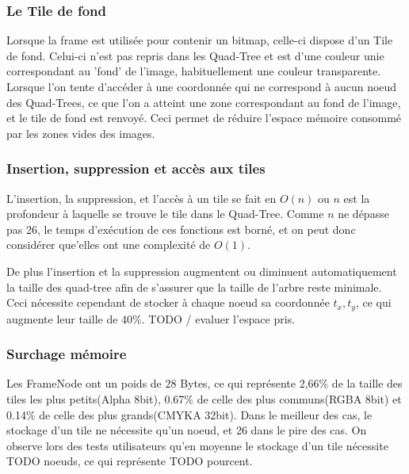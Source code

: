 			\subsubsection{Le Tile de fond}
				Lorsque la frame est utilisée pour contenir un bitmap, celle-ci dispose d'un Tile de fond. Celui-ci n'est pas repris
				dans les Quad-Tree et est d'une couleur unie correspondant au 'fond' de l'image, habituellement une couleur transparente.
				Lorsque l'on tente d'accéder à une coordonnée qui ne correspond à aucun noeud des Quad-Trees, ce que l'on a atteint une zone
				correspondant au fond de l'image, et le tile de fond est renvoyé. Ceci permet de réduire l'espace mémoire consommé par les zones 
				vides des images.

			\subsubsection{Insertion, suppression et accès aux tiles}
				L'insertion, la suppression, et l'accès à un tile se fait en $O(n)$ ou $n$ est la profondeur à laquelle se trouve le tile dans 
				le Quad-Tree. Comme $n$ ne dépasse pas 26, le temps d'exécution de ces fonctions est borné, et on peut donc considérer que'elles
				ont une complexité de $O(1)$. 
				
				De plus l'insertion et la suppression augmentent ou diminuent automatiquement la taille des 
				quad-tree afin de s'assurer que la taille de l'arbre reste minimale. Ceci nécessite cependant de stocker à chaque noeud 
				sa coordonnée $t_x,t_y$, ce qui augmente leur taille de 40\%. TODO / evaluer l'espace pris.

			\subsubsection{Surchage mémoire}
				Les FrameNode ont un poids de $28$ Bytes, ce qui représente 2,66\% de la taille des tiles les plus petits(Alpha 8bit), 0.67\% de celle des plus
				communs(RGBA 8bit)  et 0.14\% de celle des plus grands(CMYKA 32bit). Dans le meilleur des cas, le stockage d'un tile ne 
				nécessite qu'un noeud, et 26 dans le pire des cas. On observe lors des tests utilisateurs qu'en moyenne le stockage d'un tile
				nécessite TODO noeuds, ce qui représente TODO pourcent.

